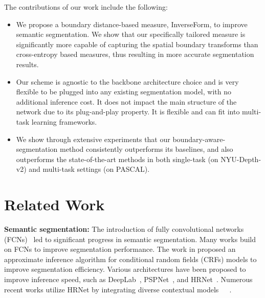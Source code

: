 \documentclass[final]{cvpr}
\begin{document}
The contributions of our work include the following:
\begin{itemize}

\item We propose a boundary distance-based measure, InverseForm, to improve semantic segmentation. We show that our specifically tailored measure is significantly more capable of capturing the spatial boundary transforms than cross-entropy based measures, thus resulting in more accurate segmentation results. 

\item Our scheme is agnostic to the backbone architecture choice and is very flexible to be plugged into any existing segmentation model, with no additional inference cost. It does not impact the main structure of the network due to its plug-and-play property. It is flexible and can fit into multi-task learning frameworks. 

\item We show through extensive experiments that our boundary-aware-segmentation method consistently outperforms its baselines, and also outperforms the state-of-the-art methods in both single-task (on NYU-Depth-v2) and multi-task settings (on PASCAL).

\end{itemize}



\section{Related Work}

\textbf{Semantic segmentation:} The introduction of fully convolutional networks (FCNs)~\cite{long2015fully} led to significant progress in semantic segmentation. Many works build on FCNs to improve segmentation performance. The work in \cite{krahenbuhl2011efficient} proposed an approximate inference algorithm for conditional random fields (CRFs) models to improve segmentation efficiency. Various architectures have been proposed to improve inference speed, such as DeepLab~\cite{chen2017deeplab}, PSPNet~\cite{zhao2017pyramid}, and HRNet~\cite{wang2020deep}. Numerous recent works utilize HRNet by integrating diverse contextual models~\cite{yuan2020objectcontextual}~\cite{yuan2020segfix}~\cite{takikawa2019gated}.
\end{document}
